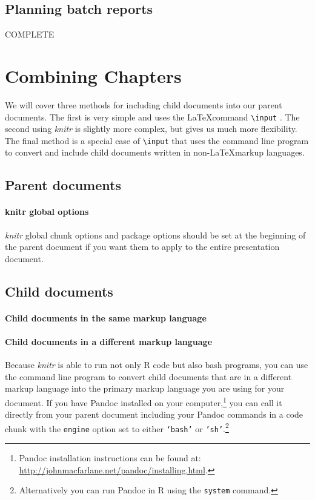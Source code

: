\documentclass[ChapterTOCs,krantz1]{krantz}\usepackage{graphicx, color}
\begin{document}
{{\subsection{Planning batch reports}

COMPLETE

\section{Combining Chapters}

We will cover three methods for including child documents into our parent documents. The first is very simple and uses the \LaTeX command \texttt{\textbackslash{}input} . The second using {\emph{knitr}} is slightly more complex, but gives us much more flexibility. The final method is a special case of \texttt{\textbackslash{}input} that uses the command line program  to convert and include child documents written in non-\LaTeX markup languages. 

\subsection{Parent documents}

\paragraph{knitr global options}
{\emph{knitr}} global chunk options and package options should be set at the beginning of the parent document if you want them to apply to the entire presentation document. 

\subsection{Child documents}

\paragraph{Child documents in the same markup language}

\paragraph{Child documents in a different markup language}

Because {\emph{knitr}} is able to run not only R code but also bash programs, you can use the  command line program to convert child documents that are in a different markup language into the primary markup language you are using for your document. If you have Pandoc installed on your computer,\footnote{Pandoc installation instructions can be found at: \url{http://johnmacfarlane.net/pandoc/installing.html}.} you can call it directly from your parent document including your Pandoc commands in a code chunk with the \texttt{engine} option set to either \texttt{`bash'} or \texttt{'sh'}.\footnote{Alternatively you can run Pandoc in R using the {\tt{system}} command.} 

}}
\end{document}
